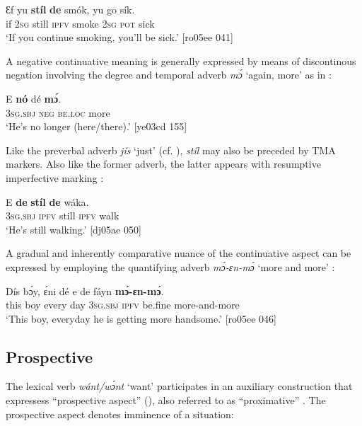 \ea%
    \label{ex:key:368}
    \gll Ɛf  yu  \textbf{stíl} \textbf{de} smók,  yu  go  sík.\\
if  \textsc{2sg}  still  \textsc{ipfv}  smoke  \textsc{2sg}  \textsc{pot}  sick\\

\glt ‘If you continue smoking, you’ll be sick.’ [ro05ee 041]
\z

A negative continuative meaning is generally expressed by means of discontinous negation involving the degree and temporal adverb \textit{mɔ́} ‘again, more’ as in :


\ea%
    \label{ex:key:369}
    \gll E    \textbf{nó}  dé\textbf{}   \textbf{mɔ́}.\\
\textsc{3sg.sbj}  \textsc{neg}  \textsc{be.loc}  more\\

\glt ‘He’s no longer (here/there).’ [ye03cd 155]
\z

Like the preverbal adverb \textit{jís} ‘just’ (cf. ), \textit{stíl} may also be preceded by TMA markers. Also like the former adverb, the latter appears with resumptive imperfective marking : 


\ea%
    \label{ex:key:370}
    \gll E    \textbf{de} \textbf{stíl} \textbf{de}  wáka.\\
\textsc{3sg.sbj}  \textsc{ipfv}  still  \textsc{ipfv}  walk\\

\glt ‘He’s still walking.’ [dj05ae 050]
\z

A gradual and inherently comparative nuance of the continuative aspect can be expressed by employing the quantifying adverb \textit{mɔ́-ɛn-mɔ́} ‘more and more’ : 


\ea%
    \label{ex:key:371}
    \gll Dís  bɔ́y,    ɛ́ni    dé  e    de  fáyn    \textbf{mɔ́-ɛn-mɔ́}.\\
this  boy    every  day  \textsc{3sg.sbj}  \textsc{ipfv}  be.fine  more-and-more\\

\glt ‘This boy, everyday he is getting more handsome.’ [ro05ee 046]
\z

\subsection{Prospective} 

The lexical verb \textit{wánt/wɔ́nt} ‘want’ participates in an auxiliary construction that expressess “prospective aspect” (\citealt[64–65]{Comrie1976}), also referred to as “proximative” \citep[36]{Heine1994}. The prospective aspect denotes imminence of a situation:


